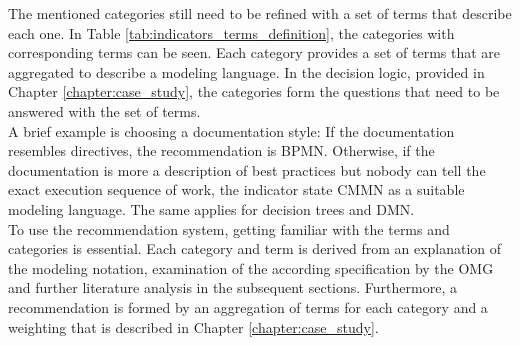 %

The mentioned categories still need to be refined with a set of terms that describe each one. In Table \ref{tab:indicators_terms_definition}, the categories with corresponding terms can be seen. Each category provides a set of terms that are aggregated to describe a modeling language. In the decision logic, provided in Chapter \ref{chapter:case_study}, the categories form the questions that need to be answered with the set of terms. \\
A brief example is choosing a documentation style: If the documentation resembles directives, the recommendation is BPMN. Otherwise, if the documentation is more a description of best practices but nobody can tell the exact execution sequence of work, the indicator state CMMN as a suitable modeling language. The same applies for decision trees and DMN.\\
To use the recommendation system, getting familiar with the terms and categories is essential. Each category and term is derived from an explanation of the modeling notation, examination of the according specification by the OMG and further literature analysis in the subsequent sections. Furthermore, a recommendation is formed by an aggregation of terms for each category and a weighting that is described in Chapter \ref{chapter:case_study}.


